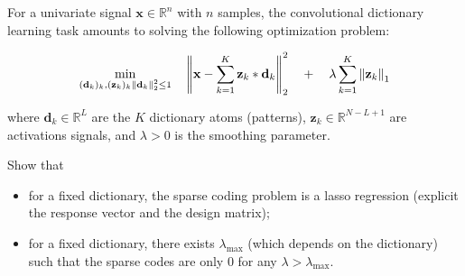 \documentclass[11pt]{article}
\begin{document}
\begin{exercise}
For a univariate signal $\mathbf{x}\in\mathbb{R}^n$ with $n$ samples, the convolutional dictionary learning task amounts to solving the following optimization problem:

\begin{equation}
\min_{(\mathbf{d}_k)_k, (\mathbf{z}_k)_k \\ \left\lVert\mathbf{d}_k\right\rVert_2^2\leq 1} \quad\left\lVert\mathbf{x} - \sum_{k=1}^K \mathbf{z}_k * \mathbf{d}_k \right\rVert^2_2 \quad + \quad\lambda \sum_{k=1}^K \left\lVert\mathbf{z}_k\right\rVert_1
\end{equation}

where $\mathbf{d}_k\in\mathbb{R}^L$ are the $K$ dictionary atoms (patterns), $\mathbf{z}_k\in\mathbb{R}^{N-L+1}$ are activations signals, and $\lambda>0$ is the smoothing parameter.

Show that
\begin{itemize}
    \item for a fixed dictionary, the sparse coding problem is a lasso regression (explicit the response vector and the design matrix);
    \item for a fixed dictionary, there exists $\lambda_{\max}$ (which depends on the dictionary) such that the sparse codes are only 0 for any $\lambda > \lambda_{\max}$. 
\end{itemize}
\end{exercise}
\end{document}
